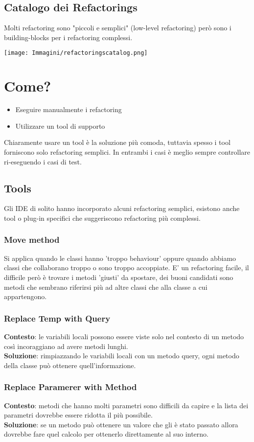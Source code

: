 \documentclass[12pt, a4paper]{report}
\begin{document}
\subsection{Catalogo dei Refactorings}
Molti refactoring sono "piccoli e semplici" (low-level refactoring) però sono i building-blocks per i refactoring complessi.
\begin{center}
    \texttt{[image: Immagini/refactoringscatalog.png]}
\end{center}
\section{Come?}
\begin{itemize}
    \item Eseguire manualmente i refactoring
    \item Utilizzare un tool di supporto
\end{itemize}
Chiaramente usare un tool è la soluzione più comoda, tuttavia spesso i tool forniscono solo refactoring semplici. In entrambi i casi è meglio sempre controllare ri-eseguendo i casi di test.
\subsection{Tools}
Gli IDE di solito hanno incorporato alcuni refactoring semplici, esistono anche tool o plug-in specifici che suggeriscono refactoring più complessi.
\subsubsection{Move method}
Si applica quando le classi hanno 'troppo behaviour' oppure quando abbiamo classi che collaborano troppo o sono troppo accoppiate. E' un refactoring facile, il difficile però è trovare i metodi 'giusti' da spostare, dei buoni candidati sono metodi che sembrano riferirsi più ad altre classi che alla classe a cui appartengono.
\subsubsection{Replace Temp with Query}
\textbf{Contesto}: le variabili locali possono essere viste solo nel contesto di un metodo così incoraggiano ad avere metodi lunghi.\\
\textbf{Soluzione}: rimpiazzando le variabili locali con un metodo query, ogni metodo della classe può ottenere quell'informazione.
\subsubsection{Replace Paramerer with Method}
\textbf{Contesto}: metodi che hanno molti parametri sono difficili da capire e la lista dei parametri dovrebbe essere ridotta il più possibile.\\
\textbf{Soluzione}: se un metodo può ottenere un valore che gli è stato passato allora dovrebbe fare quel calcolo per ottenerlo direttamente al suo interno.
\end{document}
